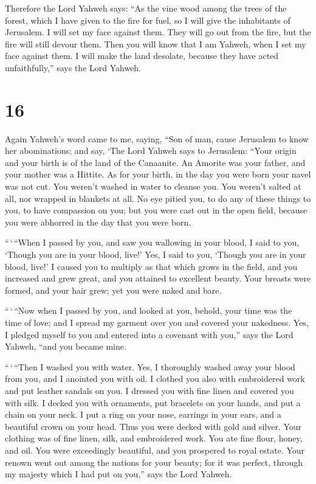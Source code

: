  Therefore the Lord Yahweh says: ``As the vine wood among
the trees of the forest, which I have given to the fire for fuel, so I
will give the inhabitants of Jerusalem.  I will set my
face against them. They will go out from the fire, but the fire will
still devour them. Then you will know that I am Yahweh, when I set my
face against them.  I will make the land desolate, because
they have acted unfaithfully,'' says the Lord Yahweh.

\hypertarget{section-15}{%
\section{16}\label{section-15}}

 Again Yahweh's word came to me, saying, 
``Son of man, cause Jerusalem to know her abominations; 
and say, `The Lord Yahweh says to Jerusalem: ``Your origin and your
birth is of the land of the Canaanite. An Amorite was your father, and
your mother was a Hittite.  As for your birth, in the day
you were born your navel was not cut. You weren't washed in water to
cleanse you. You weren't salted at all, nor wrapped in blankets at all.
 No eye pitied you, to do any of these things to you, to
have compassion on you; but you were cast out in the open field, because
you were abhorred in the day that you were born.

 ``\,`\,``When I passed by you, and saw you wallowing in
your blood, I said to you, `Though you are in your blood, live!' Yes, I
said to you, `Though you are in your blood, live!'  I
caused you to multiply as that which grows in the field, and you
increased and grew great, and you attained to excellent beauty. Your
breasts were formed, and your hair grew; yet you were naked and bare.

 ``\,`\,``Now when I passed by you, and looked at you,
behold, your time was the time of love; and I spread my garment over you
and covered your nakedness. Yes, I pledged myself to you and entered
into a covenant with you,'' says the Lord Yahweh, ``and you became mine.

 ``\,`\,``Then I washed you with water. Yes, I thoroughly
washed away your blood from you, and I anointed you with oil.
 I clothed you also with embroidered work and put leather
sandals on you. I dressed you with fine linen and covered you with silk.
 I decked you with ornaments, put bracelets on your
hands, and put a chain on your neck.  I put a ring on
your nose, earrings in your ears, and a beautiful crown on your head.
 Thus you were decked with gold and silver. Your clothing
was of fine linen, silk, and embroidered work. You ate fine flour,
honey, and oil. You were exceedingly beautiful, and you prospered to
royal estate.  Your renown went out among the nations for
your beauty; for it was perfect, through my majesty which I had put on
you,'' says the Lord Yahweh.

